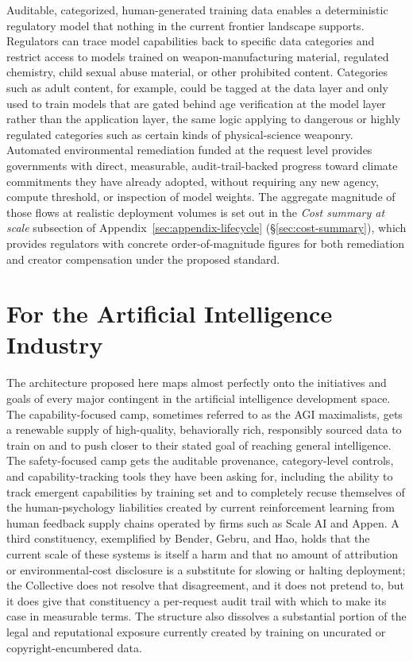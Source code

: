\documentclass[10pt,a4paper,twocolumn]{article}
\begin{document}
Auditable, categorized, human-generated training data enables a deterministic regulatory model that nothing in the current frontier landscape supports. Regulators can trace model capabilities back to specific data categories and restrict access to models trained on weapon-manufacturing material, regulated chemistry, child sexual abuse material, or other prohibited content. Categories such as adult content, for example, could be tagged at the data layer and only used to train models that are gated behind age verification at the model layer rather than the application layer, the same logic applying to dangerous or highly regulated categories such as certain kinds of physical-science weaponry. Automated environmental remediation funded at the request level provides governments with direct, measurable, audit-trail-backed progress toward climate commitments they have already adopted, without requiring any new agency, compute threshold, or inspection of model weights. The aggregate magnitude of those flows at realistic deployment volumes is set out in the \emph{Cost summary at scale} subsection of Appendix~\ref{sec:appendix-lifecycle} (\S\ref{sec:cost-summary}), which provides regulators with concrete order-of-magnitude figures for both remediation and creator compensation under the proposed standard.

\section{For the Artificial Intelligence Industry}
\label{sec:why-ai}

The architecture proposed here maps almost perfectly onto the initiatives and goals of every major contingent in the artificial intelligence development space. The capability-focused camp, sometimes referred to as the AGI maximalists, gets a renewable supply of high-quality, behaviorally rich, responsibly sourced data to train on and to push closer to their stated goal of reaching general intelligence. The safety-focused camp gets the auditable provenance, category-level controls, and capability-tracking tools they have been asking for, including the ability to track emergent capabilities by training set and to completely recuse themselves of the human-psychology liabilities created by current reinforcement learning from human feedback supply chains operated by firms such as Scale AI and Appen. A third constituency, exemplified by Bender, Gebru, and Hao, holds that the current scale of these systems is itself a harm and that no amount of attribution or environmental-cost disclosure is a substitute for slowing or halting deployment; the Collective does not resolve that disagreement, and it does not pretend to, but it does give that constituency a per-request audit trail with which to make its case in measurable terms. The structure also dissolves a substantial portion of the legal and reputational exposure currently created by training on uncurated or copyright-encumbered data.
\end{document}
